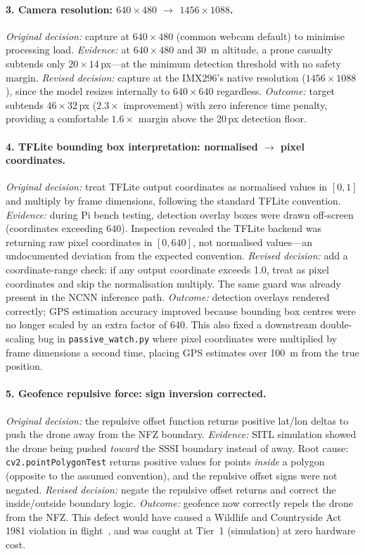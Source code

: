 \paragraph{3. Camera resolution: $640 \times 480$ $\rightarrow$ $1456 \times 1088$.}
\emph{Original decision:} capture at $640 \times 480$ (common webcam default) to minimise processing load.
\emph{Evidence:} at $640 \times 480$ and \SI{30}{\metre} altitude, a prone casualty subtends only $20 \times 14$\,px---at the minimum detection threshold with no safety margin.
\emph{Revised decision:} capture at the IMX296's native resolution ($1456 \times 1088$), since the model resizes internally to $640 \times 640$ regardless.
\emph{Outcome:} target subtends $46 \times 32$\,px ($2.3\times$ improvement) with zero inference time penalty, providing a comfortable $1.6\times$ margin above the 20\,px detection floor.

\paragraph{4. TFLite bounding box interpretation: normalised $\rightarrow$ pixel coordinates.}
\emph{Original decision:} treat TFLite output coordinates as normalised values in $[0, 1]$ and multiply by frame dimensions, following the standard TFLite convention.
\emph{Evidence:} during Pi bench testing, detection overlay boxes were drawn off-screen (coordinates exceeding 640). Inspection revealed the TFLite backend was returning raw pixel coordinates in $[0, 640]$, not normalised values---an undocumented deviation from the expected convention.
\emph{Revised decision:} add a coordinate-range check: if any output coordinate exceeds 1.0, treat as pixel coordinates and skip the normalisation multiply. The same guard was already present in the NCNN inference path.
\emph{Outcome:} detection overlays rendered correctly; GPS estimation accuracy improved because bounding box centres were no longer scaled by an extra factor of 640. This also fixed a downstream double-scaling bug in \texttt{passive\_watch.py} where pixel coordinates were multiplied by frame dimensions a second time, placing GPS estimates over \SI{100}{\metre} from the true position.

\paragraph{5. Geofence repulsive force: sign inversion corrected.}
\emph{Original decision:} the repulsive offset function returns positive lat/lon deltas to push the drone away from the NFZ boundary.
\emph{Evidence:} SITL simulation showed the drone being pushed \emph{toward} the SSSI boundary instead of away. Root cause: \texttt{cv2.pointPolygonTest} returns positive values for points \emph{inside} a polygon (opposite to the assumed convention), and the repulsive offset signs were not negated.
\emph{Revised decision:} negate the repulsive offset returns and correct the inside/outside boundary logic.
\emph{Outcome:} geofence now correctly repels the drone from the NFZ. This defect would have caused a Wildlife and Countryside Act 1981 violation in flight~\cite{wca1981}, and was caught at Tier~1 (simulation) at zero hardware cost.

